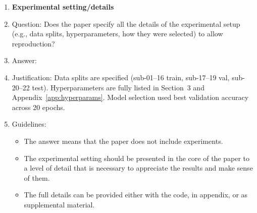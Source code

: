 \documentclass{article}
\begin{document}
\begin{enumerate}
\item {\bf Experimental setting/details}
    \item[] Question: Does the paper specify all the details of the experimental setup (e.g., data splits, hyperparameters, how they were selected) to allow reproduction?
    \item[] Answer: \answerYes{}
    \item[] Justification: Data splits are specified (sub-01--16 train, sub-17--19 val, sub-20--22 test). Hyperparameters are fully listed in Section~3 and Appendix~\ref{app:hyperparams}. Model selection used best validation accuracy across 20 epochs.
    \item[] Guidelines:
    \begin{itemize}
        \item The answer \answerNA{} means that the paper does not include experiments.
        \item The experimental setting should be presented in the core of the paper to a level of detail that is necessary to appreciate the results and make sense of them.
        \item The full details can be provided either with the code, in appendix, or as supplemental material.
    \end{itemize}


\end{enumerate}
\end{document}
